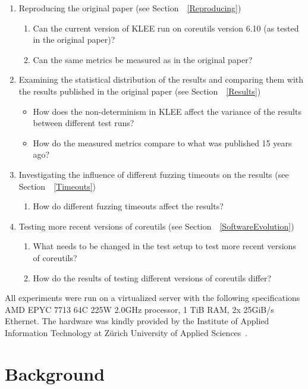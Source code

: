 \documentclass{article}
\let\savedCite=\cite
\renewcommand{\cite}{\unskip~\savedCite}
\let\savedRef=\ref
\renewcommand{\ref}{\unskip~\savedRef}
\begin{document}
\begin{enumerate}
    \item Reproducing the original paper (see Section~\ref{Reproducing})
          \begin{enumerate}
              \item Can the current version of KLEE run on coreutils version 6.10 (as tested in the original paper)?
              \item Can the same metrics be measured as in the original paper?
          \end{enumerate}
    \item Examining the statistical distribution of the results and comparing them with the results published in the original paper (see Section~\ref{Results})
          \begin{itemize}
              \item How does the non-determinism in KLEE affect the variance of the results between different test runs?
              \item How do the measured metrics compare to what was published 15 years ago?
          \end{itemize}
    \item Investigating the influence of different fuzzing timeouts on the results (see Section~\ref{Timeouts})
          \begin{enumerate}
              \item How do different fuzzing timeouts affect the results?
          \end{enumerate}
    \item Testing more recent versions of coreutils (see Section~\ref{SoftwareEvolution})
          \begin{enumerate}
              \item What needs to be changed in the test setup to test more recent versions of coreutils?
              \item How do the results of testing different versions of coreutils differ?
          \end{enumerate}
\end{enumerate}

All experiments were run on a virtualized server with the following specifications AMD EPYC 7713 64C 225W 2.0GHz processor, 1 TiB RAM, 2x 25GiB/s Ethernet. The hardware was kindly provided by the Institute of Applied Information Technology at Zürich University of Applied Sciences\cite{InIT}.

\section{Background}
\end{document}
